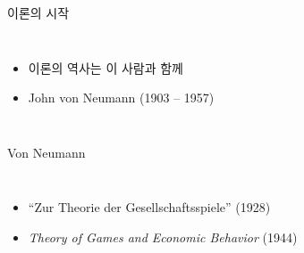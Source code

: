 \documentclass[final]{beamer}
\begin{document}
\begin{frame}[t]{이론의 시작}
	\begin{columns}[c]
	\column{18em}
	\begin{itemize}
	\item 이론의 역사는 이 사람과 함께 
	\item John von Neumann (1903 -- 1957)
	\end{itemize}
	\column{14em}
	\end{columns}
\end{frame}

\begin{frame}[t]{Von Neumann}
	\begin{columns}[c]
		\column{12em}
		\column{20em}
		\begin{itemize}
			\item ``Zur Theorie der Gesellschaftsspiele'' (1928) 
			\item {\itshape Theory of Games and Economic Behavior} (1944)
		\end{itemize}
	\end{columns}
\end{frame}
\end{document}
